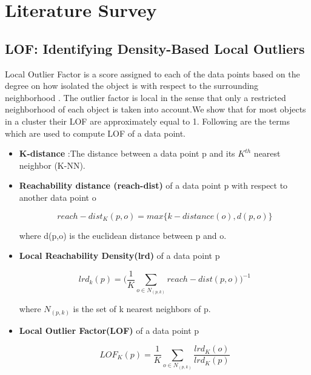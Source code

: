 \chapter{Literature Survey}\label{Unstructured}





	
	\section{LOF: Identifying Density-Based Local Outliers}
	Local Outlier Factor is a score assigned to each of the data points based on the degree on how
	isolated the object is with respect to the surrounding neighborhood \cite{b}.
	The outlier factor is local
	in the sense that only a restricted neighborhood of each object is taken into account.We show that
	for most objects in a cluster their LOF are approximately equal to 1. Following are the terms which are used to compute LOF of a data point.
	
	
		\begin{itemize}
		\item \textbf{K-distance} :The distance between a data point p
		and its $K^{th}$ nearest neighbor (K-NN).
		
		\item \textbf{Reachability distance (reach-dist)} of a data point p
		with respect to another data point o
		
		\[ reach-dist_K(p,o)=max\{k-distance(o),d(p,o)\}  \]
		
		where d(p,o) is the euclidean distance between p
		and o.
		
		
		\item \textbf{Local Reachability Density(lrd)}  of a data point p
		
		
		\[  lrd_k(p) =  \bigg( \frac{1}{K} \sum_{o \in N_{(p,k)}} reach-dist(p,o)   \bigg)^{-1}  \]
		
		
		where $N_{(p,k)}$ is the set of k nearest neighbors of p.
		
		\item
		\textbf{Local Outlier Factor(LOF)}  of a data point p
		
		\[  LOF_K(p) = \frac{1}{K} \sum_{o \in N_{(p,k)}} \frac{lrd_K(o)}{lrd_K(p)}  \]
		
	\end{itemize}
	
